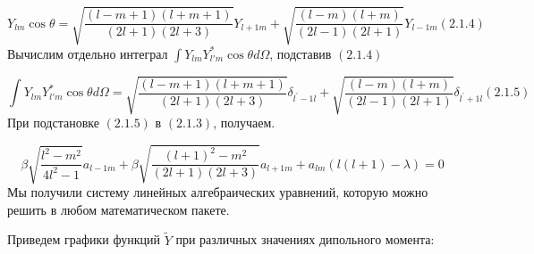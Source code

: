 \documentclass[a4paper]{article}
\begin{document}
\begin{equation*}
Y_{\mathit{lm}}\cos \theta
=\sqrt{\frac{(l-m+1)(l+m+1)}{\left(2l+1\right)(2l+3)}}Y_{l+1m}+\sqrt{\frac{(l-m)(l+m)}{\left(2l-1\right)(2l+1)}}Y_{l-1m}(2.1.4)
\end{equation*}
Вычислим отдельно
интеграл  $\int Y_{\mathit{lm}}Y_{l'm}^{\ast }\cos \theta
\mathit{d\Omega }$, подставив  $(2.1.4)$ 

\begin{equation*}
\int Y_{\mathit{lm}}Y_{l'm}^{\ast }\cos \theta \mathit{d\Omega
}=\sqrt{\frac{(l-m+1)(l+m+1)}{\left(2l+1\right)(2l+3)}}\delta
_{l^'-1l}+\sqrt{\frac{(l-m)(l+m)}{\left(2l-1\right)(2l+1)}}\delta _{l^'+1l}(2.1.5)
\end{equation*}
При подстановке  $(2.1.5)$ в 
$(2.1.3)$, получаем.

\begin{equation*}
\beta \sqrt{\frac{l^2-m^2}{4l^2-1}}a_{l-1m}+\beta
\sqrt{\frac{\left(l+1\right)^2-m^2}{\left(2l+1\right)(2l+3)}}a_{l+1m}+a_{\mathit{lm}}\left(l\left(l+1\right)-\lambda
\right)=0
\end{equation*}
Мы получили систему линейных алгебраических уравнений, которую можно решить в любом математическом пакете.

Приведем графики
функций  $\widetilde Y$ при
различных значениях дипольного момента:
\end{document}
